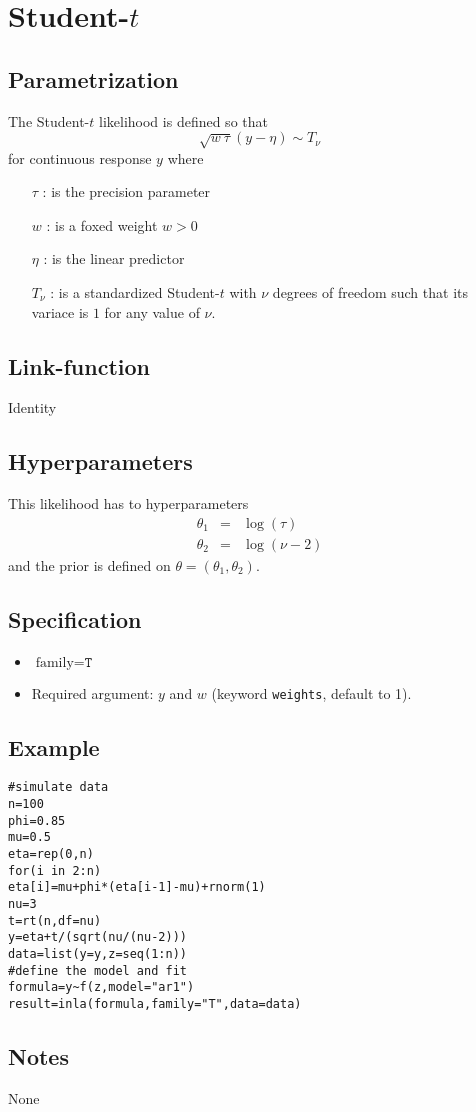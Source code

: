 \documentclass[a4paper,11pt]{article}
\begin{document}
\section*{Student-$t$}

\subsection*{Parametrization}

The Student-$t$ likelihood is defined so that 
\[
\sqrt{w\ \tau}(y - \eta)\sim T_{\nu}
\]
for continuous response $y$ where
\begin{itemize}
\item[$\tau$]: is the precision parameter
\item[$w$]: is a foxed weight $w>0$
\item[$\eta$]: is the linear predictor
\item[$T_{\nu}$]: is a standardized Student-$t$ with $\nu$ degrees of freedom such that its variace is $1$ for any value of $\nu$.
\end{itemize}
\subsection*{Link-function}

Identity

\subsection*{Hyperparameters}

This likelihood has to hyperparameters
\begin{eqnarray*}
    \theta_1 &=& \log(\tau)\\
    \theta_2&=&\log(\nu-2)
\end{eqnarray*}
and the prior is defined on $\theta=(\theta_1,\theta_2)$. 

\subsection*{Specification}

\begin{itemize}
\item $\text{family}=\texttt{T}$
\item Required argument: $y$ and $w$ (keyword {\tt weights}, default to 1).
\end{itemize}

\subsection*{Example}
\begin{verbatim}
#simulate data
n=100
phi=0.85
mu=0.5
eta=rep(0,n)
for(i in 2:n)
eta[i]=mu+phi*(eta[i-1]-mu)+rnorm(1)
nu=3
t=rt(n,df=nu)
y=eta+t/(sqrt(nu/(nu-2)))
data=list(y=y,z=seq(1:n))
#define the model and fit
formula=y~f(z,model="ar1")
result=inla(formula,family="T",data=data)
\end{verbatim}

\subsection*{Notes}
None
\end{document}
